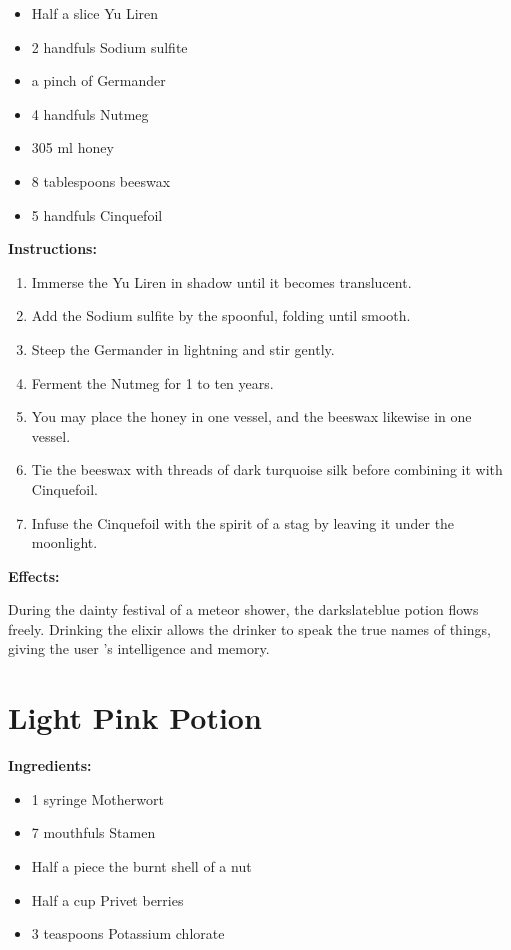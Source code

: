 \documentclass{article}
\begin{document}
\begin{itemize}
  \item Half a slice Yu Liren
  \item 2 handfuls Sodium sulfite
  \item a pinch of Germander
  \item 4 handfuls Nutmeg
  \item 305 ml honey
  \item 8 tablespoons beeswax
  \item 5 handfuls Cinquefoil
\end{itemize}

\textbf{Instructions:}

\begin{enumerate}
  \item Immerse the Yu Liren in shadow until it becomes translucent.
  \item Add the Sodium sulfite by the spoonful, folding until smooth.
  \item Steep the Germander in lightning and stir gently.
  \item Ferment the Nutmeg for 1 to ten years.
  \item You may place the honey in one vessel, and the beeswax likewise in one vessel.
  \item Tie the beeswax with threads of dark turquoise silk before combining it with Cinquefoil.
  \item Infuse the Cinquefoil with the spirit of a stag by leaving it under the moonlight.
\end{enumerate}

\textbf{Effects:}

During the dainty festival of a meteor shower, the darkslateblue potion flows freely. Drinking the elixir allows the drinker to speak the true names of things, giving the user 's intelligence and memory.

\newpage
\section*{Light Pink Potion}

\textbf{Ingredients:}

\begin{itemize}
  \item 1 syringe Motherwort
  \item 7 mouthfuls Stamen
  \item Half a piece the burnt shell of a nut
  \item Half a cup Privet berries
  \item 3 teaspoons Potassium chlorate
\end{itemize}
\end{document}
